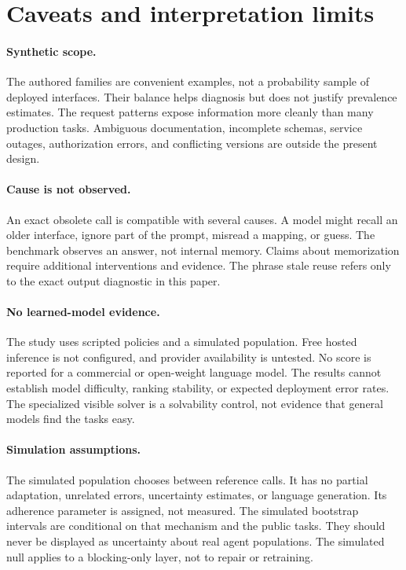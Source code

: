 \documentclass{article}
\begin{document}
\section{Caveats and interpretation limits}
\paragraph{Synthetic scope.} The authored families are convenient examples, not a probability sample of deployed interfaces. Their balance helps diagnosis but does not justify prevalence estimates. The request patterns expose information more cleanly than many production tasks. Ambiguous documentation, incomplete schemas, service outages, authorization errors, and conflicting versions are outside the present design.
\paragraph{Cause is not observed.} An exact obsolete call is compatible with several causes. A model might recall an older interface, ignore part of the prompt, misread a mapping, or guess. The benchmark observes an answer, not internal memory. Claims about memorization require additional interventions and evidence. The phrase stale reuse refers only to the exact output diagnostic in this paper.
\paragraph{No learned-model evidence.} The study uses scripted policies and a simulated population. Free hosted inference is not configured, and provider availability is untested. No score is reported for a commercial or open-weight language model. The results cannot establish model difficulty, ranking stability, or expected deployment error rates. The specialized visible solver is a solvability control, not evidence that general models find the tasks easy.
\paragraph{Simulation assumptions.} The simulated population chooses between reference calls. It has no partial adaptation, unrelated errors, uncertainty estimates, or language generation. Its adherence parameter is assigned, not measured. The simulated bootstrap intervals are conditional on that mechanism and the public tasks. They should never be displayed as uncertainty about real agent populations. The simulated null applies to a blocking-only layer, not to repair or retraining.
\end{document}
